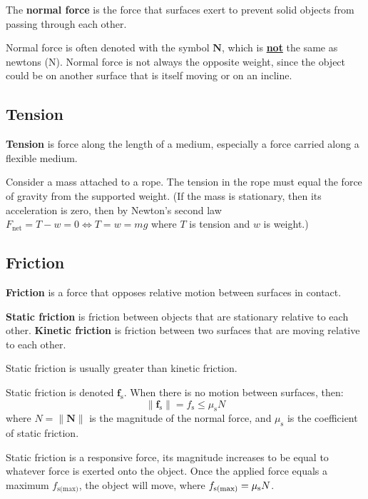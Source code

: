 \documentclass{article}
\newcommand{\definition}[1]{\begin{tcolorbox}[colback=red!5!white,colframe=red!75!black,parbox=false] #1 \end{tcolorbox}}
\begin{document}
\definition{The \textbf{normal force} is the force that surfaces exert to prevent solid objects from passing through each other.}

Normal force is often denoted with the symbol $\mathbf{N}$, which is \underline{\textbf{not}} the same as newtons (N). Normal force is not always the opposite weight, since the object could be on another surface that is itself moving or on an incline.

\subsection{Tension}

\definition{\textbf{Tension} is force along the length of a medium, especially a force carried along a flexible medium.}

Consider a mass attached to a rope. The tension in the rope must equal the force of gravity from the supported weight. (If the mass is stationary, then its acceleration is zero, then by Newton's second law $F_{\text{net}}=T-w=0\iff T=w=mg$ where $T$ is tension and $w$ is weight.)

\subsection{Friction}

\definition{\textbf{Friction} is a force that opposes relative motion between surfaces in contact.}

\definition{\textbf{Static friction} is friction between objects that are stationary relative to each other. \textbf{Kinetic friction} is friction between two surfaces that are moving relative to each other.}

Static friction is usually greater than kinetic friction.

Static friction is denoted $\mathbf{f}_{\text{s}}$. When there is no motion between surfaces, then:
\begin{equation*}
	\lVert \mathbf{f}_{\text{s}}\rVert =f_{\text{s}}\leq \mu_{\text{s}} N
\end{equation*}
where $N=\lVert \mathbf N \rVert $ is the magnitude of the normal force, and $\mu_{\text{s}}$ is the coefficient of static friction.

Static friction is a responsive force, its magnitude increases to be equal to whatever force is exerted onto the object. Once the applied force equals a maximum $f_{\text{s(max)}}$, the object will move, where $f_{\text{s(max)}}=\mu_{\text s}N$.
\end{document}
